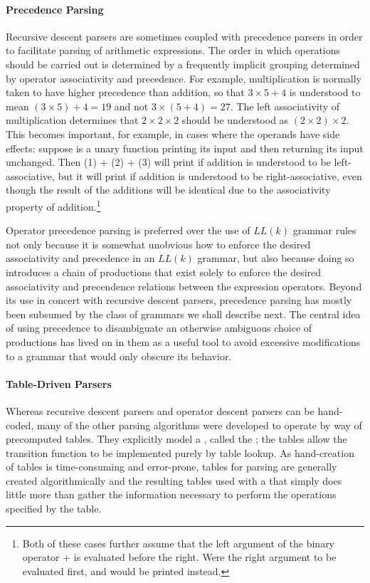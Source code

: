 \paragraph{Precedence Parsing}
Recursive descent parsers are sometimes coupled with precedence parsers in order to facilitate parsing of arithmetic expressions. The order in which operations should be carried out is determined by a frequently implicit grouping determined by operator associativity and precedence. For example, multiplication is normally taken to have higher precedence than addition, so that $3 \times 5 + 4$ is understood to mean $(3 \times 5) + 4 = 19$ and not $3 \times (5 + 4) = 27.$ The left associativity of multiplication determines that $2 \times 2 \times 2$ should be understood as $(2 \times 2) \times 2.$ This becomes important, for example, in cases where the operands have side effects: suppose  is a unary function printing its input and then returning its input unchanged. Then (1) + (2) + (3) will print  if addition is understood to be left-associative, but it will print  if addition is understood to be right-associative, even though the result of the additions will be identical due to the associativity property of addition.\footnote{Both of these cases further assume that the left argument of the binary operator + is evaluated before the right. Were the right argument to be evaluated first,  and  would be printed instead.}

Operator precedence parsing is preferred over the use of $LL(k)$ grammar rules not only because it is somewhat unobvious how to enforce the desired associativity and precedence in an $LL(k)$ grammar, but also because doing so introduces a chain of productions that exist solely to enforce the desired associativity and precendence relations between the expression operators. Beyond its use in concert with recursive descent parsers, precedence parsing has mostly been subsumed by the class of grammars we shall describe next. The central idea of using precedence to disambiguate an otherwise ambiguous choice of productions has lived on in them as a useful tool to avoid excessive modifications to a grammar that would only obscure its behavior.

\paragraph{Table-Driven Parsers}
Whereas recursive descent parsers and operator descent parsers can be hand-coded, many of the other parsing algorithms were developed to operate by way of precomputed tables. They explicitly model a \FA, called the ; the tables allow the transition function to be implemented purely by table lookup. As hand-creation of tables is time-consuming and error-prone, tables for parsing are generally created algorithmically and the resulting tables used with a  that simply does little more than gather the information necessary to perform the operations specified by the table.

